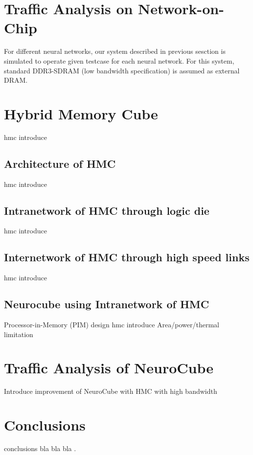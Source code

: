 \documentclass[pageno]{jpaper}
\begin{document}
\section{Traffic Analysis on Network-on-Chip}
For different neural networks, our system described in previous sesction is simulated to operate given testcase for each neural network. For this system, standard DDR3-SDRAM (low bandwidth specification) is assumed as external DRAM.




\section{Hybrid Memory Cube}
hmc introduce
\subsection{Architecture of HMC}
hmc introduce
\subsection{Intranetwork of HMC through logic die}
hmc introduce
\subsection{Internetwork of HMC through high speed links}
hmc introduce
\subsection{Neurocube using Intranetwork of HMC}
Processor-in-Memory (PIM) design hmc introduce
Area/power/thermal limitation

\section{Traffic Analysis of NeuroCube}
Introduce improvement of NeuroCube with HMC with high bandwidth


\section{Conclusions}
conclusions 
bla bla bla \cite{basheer2000artificial}.


\clearpage
{}


\end{document}
